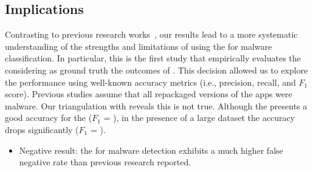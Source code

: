 \begin{comment} First, the proportion of malware samples in the
datasets differs. That is, \vt labels \review{$66.95$\%} of the repackaged version of the apps in the \cds as malware---contrasting with 67.64\% of the samples that \vt labels as malware in the \sds.
\end{comment}

\subsection{Implications}\label{sec:implications} 

Contrasting to previous research works~\cite{DBLP:conf/wcre/BaoLL18,DBLP:conf/iceccs/LeB0GL18,DBLP:journals/jss/CostaMMSSBNR22},
our results 
lead to a more systematic understanding
of the strengths and limitations of using the \mas
for malware classification. In particular, this is the
first study that empirically evaluates the \mas
considering as ground truth the outcomes
of \vt. This decision allowed us to explore the
\mas performance using well-known accuracy metrics (i.e., precision, recall, and
$F_1$ score). Previous studies assume that all repackaged versions of the
apps were malware. Our triangulation with \vt reveals this is not true. Although
the \mas presents a good accuracy for the \sds ($F_1$ = \fscoreSmall), 
in the presence of a large dataset the \mas accuracy drops significantly ($F_1$ = \fscore). 


\begin{itemize}
  \item Negative result: the \mas for malware detection exhibits a much higher false negative rate than previous research reported. 
  

    
\end{itemize}  


